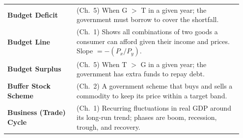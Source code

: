 \documentclass[11pt, a4paper, twoside]{book}
\begin{document}
\begin{longtable}{@{}>{\RaggedRight\arraybackslash}p{0.28\linewidth}>{\RaggedRight\arraybackslash}p{0.67\linewidth}@{}}
\textbf{Budget Deficit} & (Ch.~5) When G $>$ T in a given year; the government must borrow to cover the shortfall. \\
\textbf{Budget Line} & (Ch.~1) Shows all combinations of two goods a consumer can afford given their income and prices. Slope $= -(P_x/P_y)$. \\
\textbf{Budget Surplus} & (Ch.~5) When T $>$ G in a given year; the government has extra funds to repay debt. \\
\textbf{Buffer Stock Scheme} & (Ch.~2) A government scheme that buys and sells a commodity to keep its price within a target band. \\
\textbf{Business (Trade) Cycle} & (Ch.~1) Recurring fluctuations in real GDP around its long-run trend; phases are boom, recession, trough, and recovery. \\


\end{longtable}
\end{document}
